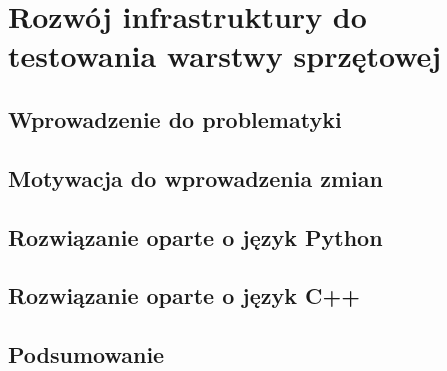 \clearpage
\section{Rozwój infrastruktury do testowania warstwy sprzętowej}
\label{ch:hardware_testing}

\subsection{Wprowadzenie do problematyki}

\subsection{Motywacja do wprowadzenia zmian}

\subsection{Rozwiązanie oparte o język Python}

\subsection{Rozwiązanie oparte o język C++}

\subsection{Podsumowanie}